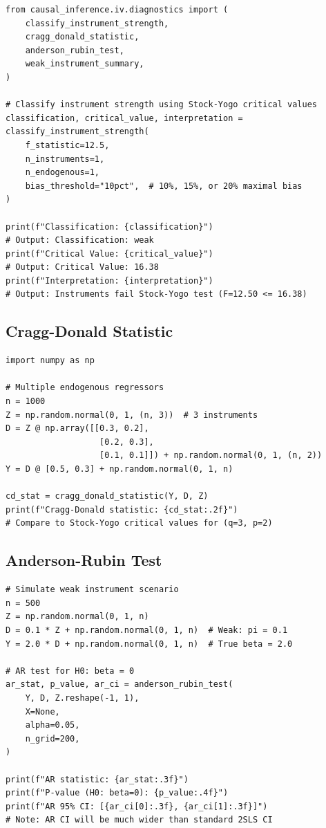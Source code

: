 \begin{verbatim}
from causal_inference.iv.diagnostics import (
    classify_instrument_strength,
    cragg_donald_statistic,
    anderson_rubin_test,
    weak_instrument_summary,
)

# Classify instrument strength using Stock-Yogo critical values
classification, critical_value, interpretation = classify_instrument_strength(
    f_statistic=12.5,
    n_instruments=1,
    n_endogenous=1,
    bias_threshold="10pct",  # 10%, 15%, or 20% maximal bias
)

print(f"Classification: {classification}")
# Output: Classification: weak
print(f"Critical Value: {critical_value}")
# Output: Critical Value: 16.38
print(f"Interpretation: {interpretation}")
# Output: Instruments fail Stock-Yogo test (F=12.50 <= 16.38)
\end{verbatim}

\subsection{Cragg-Donald Statistic}

\begin{verbatim}
import numpy as np

# Multiple endogenous regressors
n = 1000
Z = np.random.normal(0, 1, (n, 3))  # 3 instruments
D = Z @ np.array([[0.3, 0.2],
                   [0.2, 0.3],
                   [0.1, 0.1]]) + np.random.normal(0, 1, (n, 2))
Y = D @ [0.5, 0.3] + np.random.normal(0, 1, n)

cd_stat = cragg_donald_statistic(Y, D, Z)
print(f"Cragg-Donald statistic: {cd_stat:.2f}")
# Compare to Stock-Yogo critical values for (q=3, p=2)
\end{verbatim}

\subsection{Anderson-Rubin Test}

\begin{verbatim}
# Simulate weak instrument scenario
n = 500
Z = np.random.normal(0, 1, n)
D = 0.1 * Z + np.random.normal(0, 1, n)  # Weak: pi = 0.1
Y = 2.0 * D + np.random.normal(0, 1, n)  # True beta = 2.0

# AR test for H0: beta = 0
ar_stat, p_value, ar_ci = anderson_rubin_test(
    Y, D, Z.reshape(-1, 1),
    X=None,
    alpha=0.05,
    n_grid=200,
)

print(f"AR statistic: {ar_stat:.3f}")
print(f"P-value (H0: beta=0): {p_value:.4f}")
print(f"AR 95% CI: [{ar_ci[0]:.3f}, {ar_ci[1]:.3f}]")
# Note: AR CI will be much wider than standard 2SLS CI
\end{verbatim}

